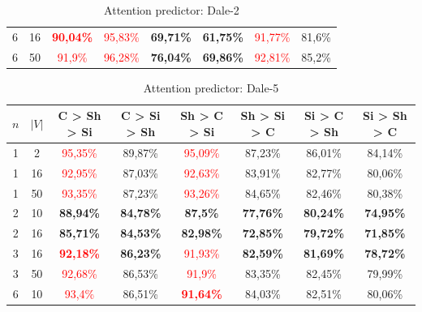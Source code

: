 \begin{table}[ht]
\begin{tabular}{cc|c|c|c|c|c|c}
        {6} & {16}  & \textcolor{red}{\textbf{90,04\%}} & \textcolor{red}{95,83\%}          & \textbf{69,71\%}         & \textbf{61,75\%}         & \textcolor{red}{91,77\%} & {81,6\%}                 \\
        {6} & {50}  & \textcolor{red}{91,9\%}           & \textcolor{red}{96,28\%}          & \textbf{76,04\%}         & \textbf{69,86\%}         & \textcolor{red}{92,81\%} & {85,2\%}                 \\
        \bottomrule
    \end{tabular}
    \caption{Attention predictor: Dale-2}
    \label{tab:probing:attention-predictor:dale-2}
\end{table}

\begin{table}[ht]
    \centering
    \begin{tabular}{cc|c|c|c|c|c|c}
        \toprule
        $n$ & $|V|$ & \textbf{C > Sh > Si}              & \textbf{C > Si > Sh} & \textbf{Sh > C > Si}              & \textbf{Sh > Si > C} & \textbf{Si > C > Sh} & \textbf{Si > Sh > C} \\\midrule
        {1} & {2}   & \textcolor{red}{95,35\%}          & {89,87\%}            & \textcolor{red}{95,09\%}          & {87,23\%}            & {86,01\%}            & {84,14\%}            \\
        {1} & {16}  & \textcolor{red}{92,95\%}          & {87,03\%}            & \textcolor{red}{92,63\%}          & {83,91\%}            & {82,77\%}            & {80,06\%}            \\
        {1} & {50}  & \textcolor{red}{93,35\%}          & {87,23\%}            & \textcolor{red}{93,26\%}          & {84,65\%}            & {82,46\%}            & {80,38\%}            \\
        {2} & {10}  & \textbf{88,94\%}                  & \textbf{84,78\%}     & \textbf{87,5\%}                   & \textbf{77,76\%}     & \textbf{80,24\%}     & \textbf{74,95\%}     \\
        {2} & {16}  & \textbf{85,71\%}                  & \textbf{84,53\%}     & \textbf{82,98\%}                  & \textbf{72,85\%}     & \textbf{79,72\%}     & \textbf{71,85\%}     \\
        {3} & {16}  & \textcolor{red}{\textbf{92,18\%}} & \textbf{86,23\%}     & \textcolor{red}{91,93\%}          & \textbf{82,59\%}     & \textbf{81,69\%}     & \textbf{78,72\%}     \\
        {3} & {50}  & \textcolor{red}{92,68\%}          & {86,53\%}            & \textcolor{red}{91,9\%}           & {83,35\%}            & {82,45\%}            & {79,99\%}            \\
        {6} & {10}  & \textcolor{red}{93,4\%}           & {86,51\%}            & \textcolor{red}{\textbf{91,64\%}} & {84,03\%}            & {82,51\%}            & {80,06\%}            \\
        \bottomrule
    \end{tabular}
    \caption{Attention predictor: Dale-5}
    \label{tab:probing:attention-predictor:dale-5}
\end{table}

